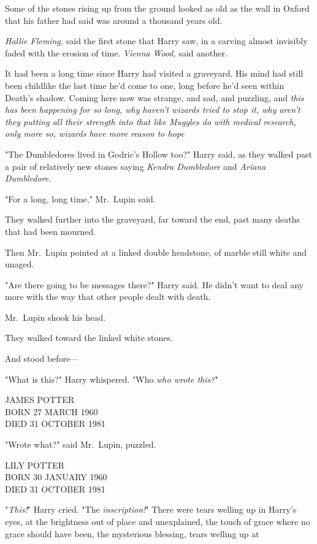 Some of the stones rising up from the ground looked as old as the wall in
Oxford that his father had said was around a thousand years old.

\emph{Hallie Fleming,} said the first stone that Harry saw, in a carving almost
invisibly faded with the erosion of time. \emph{Vienna Wood,} said another.

It had been a long time since Harry had visited a graveyard. His mind had still
been childlike the last time he'd come to one, long before he'd seen within
Death's shadow. Coming here now was{\el} strange, and sad, and puzzling, and
\emph{this has been happening for so long, why haven't wizards tried to stop
it, why aren't they putting all their strength into that like Muggles do with
medical research, only more so, wizards have more reason to hope{\el}}

"The Dumbledores lived in Godric's Hollow too?" Harry said, as they walked past
a pair of relatively new stones saying \emph{Kendra Dumbledore} and
\emph{Ariana Dumbledore.}

"For a long, long time," Mr.~Lupin said.

They walked further into the graveyard, far toward the end, past many deaths
that had been mourned.

Then Mr.~Lupin pointed at a linked double headstone, of marble still white and
unaged.

"Are there going to be messages there?" Harry said. He didn't want to deal any
more with the way that other people dealt with death.

Mr.~Lupin shook his head.

They walked toward the linked white stones.

And stood before---

"What is this?" Harry whispered. "Who{\el} \emph{who wrote this?}"

\begin{center}
JAMES POTTER\\
BORN 27 MARCH 1960\\
DIED 31 OCTOBER 1981
\end{center}

"Wrote what?" said Mr.~Lupin, puzzled.

\begin{center}
LILY POTTER\\
BORN 30 JANUARY 1960\\
DIED 31 OCTOBER 1981
\end{center}

"\emph{This!}" Harry cried. "The \emph{inscription!}" There were tears welling
up in Harry's eyes, at the brightness out of place and unexplained, the touch
of grace where no grace should have been, the mysterious blessing, tears
welling up at

